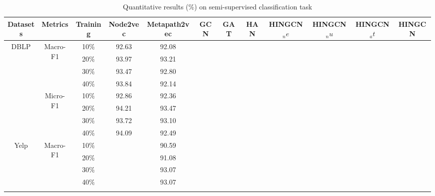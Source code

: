 \begin{table*}[!htbp]
\centering
\caption{Quantitative results (\%) on semi-supervised classification task}
\label{tab:result}
\begin{tabular}{|c|c|c||c|c|c|c|c||c|c|c|c|}
\hline
Datasets                  & Metrics                   & Training & Node2vec & Metapath2vec & GCN & GAT & HAN & HINGCN$_ne$ & HINGCN$_nu$ & HINGCN$_at$ & HINGCN \\ \hline
\multirow{8}{*}{DBLP}     & \multirow{4}{*}{Macro-F1} & 10\%     &  92.63   &   92.08      &     &     &     &        &        &        &        \\
                          &                           & 20\%     &  93.97   &   93.21      &     &     &     &        &        &        &        \\
                          &                           & 30\%     &  93.47   &   92.80      &     &     &     &        &        &        &        \\
                          &                           & 40\%     &  93.84   &   92.14      &     &     &     &        &        &        &        \\ \cline{2-12} 
                          & \multirow{4}{*}{Micro-F1} & 10\%     &  92.86   &   92.36      &     &     &     &        &        &        &        \\
                          &                           & 20\%     &  94.21   &   93.47      &     &     &     &        &        &        &        \\
                          &                           & 30\%     &  93.72   &   93.10      &     &     &     &        &        &        &        \\
                          &                           & 40\%     &  94.09   &   92.49      &     &     &     &        &        &        &        \\ \hline
\multirow{8}{*}{Yelp}     & \multirow{4}{*}{Macro-F1} & 10\%     &          &   90.59      &     &     &     &        &        &        &        \\
                          &                           & 20\%     &          &   91.08      &     &     &     &        &        &        &        \\
                          &                           & 30\%     &          &   93.07      &     &     &     &        &        &        &        \\
                          &                           & 40\%     &          &   93.07      &     &     &     &        &        &        &        \\ \cline{2-12} 

\end{tabular}
\end{table*}
